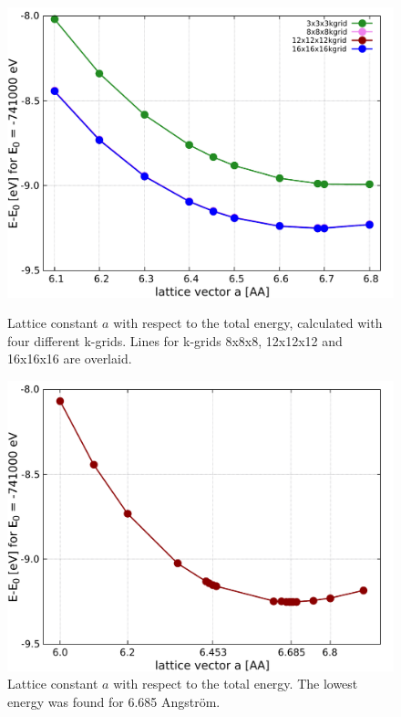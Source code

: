 \begin{figure}[ht!]
	\begin{minipage}{0.48\linewidth}
		\centering
		\includegraphics[width=\linewidth]{andere_bilder/plot_energies_hgte_bulk_all_kgrid_in_one.pdf}
		\caption{Lattice constant $a$ with respect to the total energy, calculated with four different k-grids. Lines for k-grids 8x8x8, 12x12x12 and 16x16x16 are overlaid.}\label{kgrid_lattice_constant}
	\end{minipage}
	\hfill
	\begin{minipage}{0.48\linewidth}
		\centering
		\includegraphics[width=\linewidth]{andere_bilder/lattice_constant_study_spin_none_no_soc.pdf}
		\caption{Lattice constant $a$ with respect to the total energy. The lowest energy was found for 6.685 Angström.}\label{lattice_constant}  \vspace{12.5pt}
	\end{minipage}
\end{figure}

